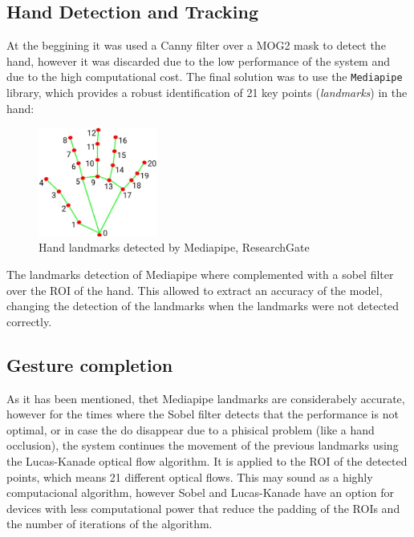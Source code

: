 \documentclass[a4paper,12pt]{article}
\begin{document}
{\subsection{Hand Detection and Tracking}


At the beggining it was used a Canny filter over a MOG2 mask to detect the hand, however it was discarded due to the low performance of the system and due to the
high computational cost. The final solution was to use the \texttt{Mediapipe} library, which provides a robust identification of 21 key points (\textit{landmarks}) in the hand:

\begin{figure}[H]
  \centering
  \includegraphics[width=0.35\textwidth]{contents/mediapipe.jpg}
  \caption{Hand landmarks detected by Mediapipe, ResearchGate}
  \label{fig:mediapipe}
\end{figure}

The landmarks detection of Mediapipe where complemented with a sobel filter over the ROI of the hand. This allowed to extract an accuracy of the model, changing the detection
of the landmarks when the landmarks were not detected correctly.

\subsection{Gesture completion}

As it has been mentioned, thet Mediapipe landmarks are considerabely accurate, however for the times where the Sobel filter detects that the performance is not optimal,
or in case the do disappear due to a phisical problem (like a hand occlusion), the system continues the movement of the previous landmarks using the Lucas-Kanade optical 
flow algorithm. It is applied to the ROI of the detected points, which means 21 different optical flows. This may sound as a highly computacional algorithm, however Sobel
and Lucas-Kanade have an option for devices with less computational power that reduce the padding of the ROIs and the number of iterations of the algorithm.

}
\end{document}
